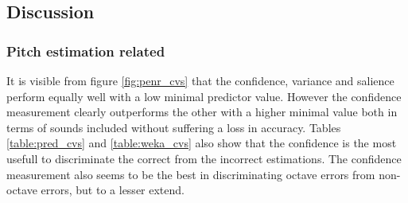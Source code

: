 \documentclass{article}
\begin{document}
\subsection{Discussion}
\subsubsection{Pitch estimation related}
It is visible from figure \ref{fig:penr_cvs}  that the confidence, variance and salience perform equally well with a low minimal predictor value. However the confidence measurement clearly outperforms the other with a higher minimal value both in terms of sounds included without suffering a loss in accuracy. Tables \ref{table:pred_cvs} and \ref{table:weka_cvs} also show that the confidence is the most usefull to discriminate the correct from the incorrect estimations. 
The confidence measurement also seems to be the best in discriminating octave errors from non-octave errors, but to a lesser extend.
\end{document}
